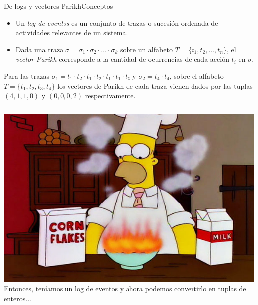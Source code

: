 \documentclass[spanish,pdf]{beamer}
\begin{document}
\begin{frame}{De logs y vectores Parikh}{Conceptos}
  \scriptsize
  \begin{itemize}
    \setlength\itemsep{0.1cm}
    \item<1-> Un \textit{log de eventos} es un conjunto de trazas o sucesión ordenada de actividades relevantes de un sistema.

    \item<2-> Dada una traza $\sigma=\sigma_1\cdot\sigma_2\cdot\ldots\cdot\sigma_k$ sobre un alfabeto
        $T=\{t_1,t_2,\dots,t_n\}$, el \textit{vector Parikh} corresponde a la cantidad de ocurrencias
        de cada acción $t_i$ en $\sigma$.
  \end{itemize}

  \pause[3]
   \begin{example}
       Para las trazas $\sigma_1=t_1 \cdot t_2 \cdot t_1 \cdot t_2 \cdot t_1 \cdot t_1 \cdot t_3$ y $\sigma_2=t_4 \cdot t_4$,
       sobre el alfabeto $T=\{t_1,t_2,t_3,t_4\}$ los vectores de Parikh de cada traza vienen dados por las tuplas $(4,1,1,0)$ y $(0,0,0,2)$ respectivamente.
   \end{example}

  \begin{columns}
        \pause[5]
        \centering
        \includegraphics[width=1.2\linewidth]{img/homer-simpson-cooking.jpg}
        \pause[4]
        Entonces, teníamos un log de eventos y ahora podemos convertirlo en tuplas de enteros...
  \end{columns}
\end{frame}
\end{document}
